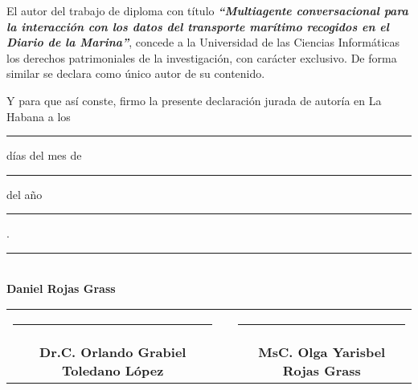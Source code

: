 \authorshipdeclared

\parskip 10pt 
\setlength{\parindent}{0pc}

El autor del trabajo de diploma con título  \textit{\textbf{“Multiagente conversacional para la interacción con los datos del transporte marítimo recogidos en el Diario de la Marina”}}, concede a la Universidad de las Ciencias Informáticas los derechos patrimoniales de la investigación, con carácter exclusivo. De forma similar se declara como único autor de su contenido.

Y para que así conste, firmo la presente declaración jurada de autoría en La Habana a los \rule{8mm}{0.2mm} días del mes de \rule{30mm}{0.2mm} del año \rule{15mm}{0.2mm}.


\vspace{1in}

\begin{center}
	\rule{60mm}{0.3mm} \\
	\textbf{Daniel Rojas Grass}
\end{center}

\vspace{0.5in}

\begin{center}
	\begin{tabular}{cp{0.5in}c}		
		\rule{65mm}{0.3mm}      & & \rule{65mm}{0.3mm}        \\
		\textbf{Dr.C. Orlando Grabiel Toledano López}      & & \textbf{MsC. Olga Yarisbel Rojas Grass}
	\end{tabular}
\end{center}

\vspace{0.5in}
